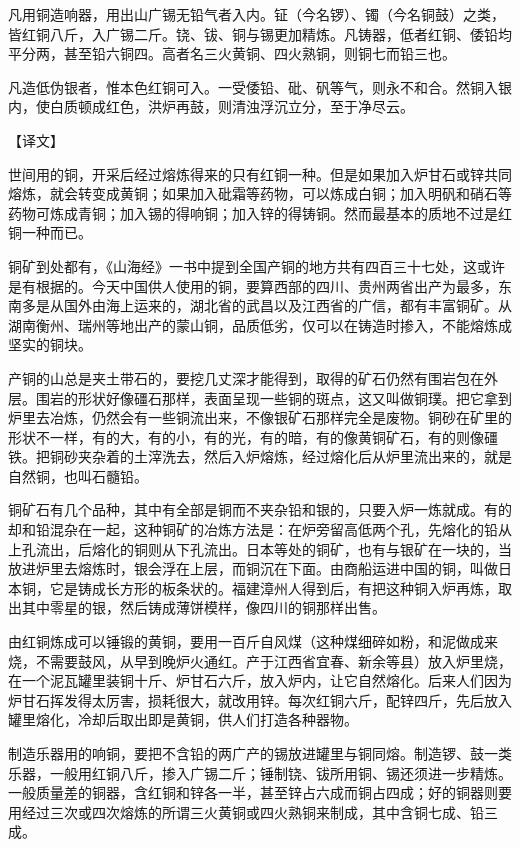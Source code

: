 \documentclass[12pt,UTF8]{ctexbook}
\begin{document}
凡用铜造响器，用出山广锡无铅气者入内。钲（今名锣）、镯（今名铜鼓）之类，皆红铜八斤，入广锡二斤。铙、钹、铜与锡更加精炼。凡铸器，低者红铜、倭铅均平分两，甚至铅六铜四。高者名三火黄铜、四火熟铜，则铜七而铅三也。

凡造低伪银者，惟本色红铜可入。一受倭铅、砒、矾等气，则永不和合。然铜入银内，使白质顿成红色，洪炉再鼓，则清浊浮沉立分，至于净尽云。

【译文】

世间用的铜，开采后经过熔炼得来的只有红铜一种。但是如果加入炉甘石或锌共同熔炼，就会转变成黄铜；如果加入砒霜等药物，可以炼成白铜；加入明矾和硝石等药物可炼成青铜；加入锡的得响铜；加入锌的得铸铜。然而最基本的质地不过是红铜一种而已。

铜矿到处都有，《山海经》一书中提到全国产铜的地方共有四百三十七处，这或许是有根据的。今天中国供人使用的铜，要算西部的四川、贵州两省出产为最多，东南多是从国外由海上运来的，湖北省的武昌以及江西省的广信，都有丰富铜矿。从湖南衡州、瑞州等地出产的蒙山铜，品质低劣，仅可以在铸造时掺入，不能熔炼成坚实的铜块。

产铜的山总是夹土带石的，要挖几丈深才能得到，取得的矿石仍然有围岩包在外层。围岩的形状好像礓石那样，表面呈现一些铜的斑点，这又叫做铜璞。把它拿到炉里去冶炼，仍然会有一些铜流出来，不像银矿石那样完全是废物。铜砂在矿里的形状不一样，有的大，有的小，有的光，有的暗，有的像黄铜矿石，有的则像礓铁。把铜砂夹杂着的土滓洗去，然后入炉熔炼，经过熔化后从炉里流出来的，就是自然铜，也叫石髓铅。

铜矿石有几个品种，其中有全部是铜而不夹杂铅和银的，只要入炉一炼就成。有的却和铅混杂在一起，这种铜矿的冶炼方法是：在炉旁留高低两个孔，先熔化的铅从上孔流出，后熔化的铜则从下孔流出。日本等处的铜矿，也有与银矿在一块的，当放进炉里去熔炼时，银会浮在上层，而铜沉在下面。由商船运进中国的铜，叫做日本铜，它是铸成长方形的板条状的。福建漳州人得到后，有把这种铜入炉再炼，取出其中零星的银，然后铸成薄饼模样，像四川的铜那样出售。

由红铜炼成可以锤锻的黄铜，要用一百斤自风煤（这种煤细碎如粉，和泥做成来烧，不需要鼓风，从早到晚炉火通红。产于江西省宜春、新余等县）放入炉里烧，在一个泥瓦罐里装铜十斤、炉甘石六斤，放入炉内，让它自然熔化。后来人们因为炉甘石挥发得太厉害，损耗很大，就改用锌。每次红铜六斤，配锌四斤，先后放入罐里熔化，冷却后取出即是黄铜，供人们打造各种器物。

制造乐器用的响铜，要把不含铅的两广产的锡放进罐里与铜同熔。制造锣、鼓一类乐器，一般用红铜八斤，掺入广锡二斤；锤制铙、钹所用铜、锡还须进一步精炼。一般质量差的铜器，含红铜和锌各一半，甚至锌占六成而铜占四成；好的铜器则要用经过三次或四次熔炼的所谓三火黄铜或四火熟铜来制成，其中含铜七成、铅三成。
\end{document}

